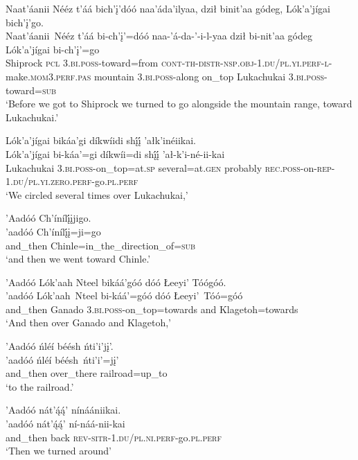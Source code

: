 \ea\label{ex:text9-3-17}
Naat’áanii Nééz t’áá bich’į’dóó naa’áda’ilyaa, dził binit’aa gódeg, Lók’a’jígai bich’į’go.\\
\gll Naat’áanii~{Nééz}	t’áá	bi-ch’į’=dóó	naa-’á-da-’-i-l-yaa	dził	bi-nit’aa	gódeg	Lók’a’jígai	bi-ch’į’=go\\
     Shiprock	\textsc{pcl}	3.\textsc{bi}.\textsc{poss}-toward=from	\textsc{cont}-\textsc{th}-\textsc{distr}-\textsc{nsp}.\textsc{obj}-1.\textsc{du}/\textsc{pl}.\textsc{yi}.\textsc{perf}-\textsc{l}-make.\textsc{mom}3.\textsc{perf}.\textsc{pas}	mountain	3.\textsc{bi}.\textsc{poss}-along	on\_top	Lukachukai	3.\textsc{bi}.\textsc{poss}-toward=\textsc{sub}\\
\glt `Before we got to Shiprock we turned to go alongside the mountain range, toward Lukachukai.'
\z

\ea\label{ex:text9-3-18}
Lók’a’jígai bikáa’gi díkwíidi shį́į́ ’ałk’inéiikai.\\
\gll Lók’a’jígai	bi-káa’=gi	díkwíi=di	shį́į́	’ał-k’i-né-ii-kai\\
     Lukachukai	3.\textsc{bi}.\textsc{poss}-on\_top=at.\textsc{sp}	several=at.\textsc{gen}	probably	\textsc{rec}.\textsc{poss}-on-\textsc{rep}-1.\textsc{du}/\textsc{pl}.\textsc{yi}.\textsc{zero}.\textsc{perf}-go.\textsc{pl}.\textsc{perf}\\
\glt `We circled several times over Lukachukai,'
\z

\ea\label{ex:text9-3-19}
’Aadóó Ch’ínílį́įjigo.\\
\gll ’aadóó	Ch’ínílį́į=ji=go\\
     and\_then	Chinle=in\_the\_direction\_of=\textsc{sub}\\
\glt `and then we went toward Chinle.'
\z

\ea\label{ex:text9-3-20}
’Aadóó Lók’aah Nteel bikáá’góó dóó Łeeyi’ Tóógóó.\\
\gll ’aadóó	Lók’aah~{Nteel}	bi-káá’=góó	dóó	Łeeyi’~{Tóó=góó}\\
     and\_then	Ganado	3.\textsc{bi}.\textsc{poss}-on\_top=towards	and	Klagetoh=towards\\
\glt `And then over Ganado and Klagetoh,'
\z

\ea\label{ex:text9-3-21}
’Aadóó ńléí béésh ńti’i’jį’.\\
\gll ’aadóó	ńléí	béésh~{ńti’i’=jį’}\\
     and\_then	over\_there	railroad=up\_to\\
\glt `to the railroad.'
\z

\ea\label{ex:text9-3-22}
’Aadóó nát’ą́ą́’ nínáániikai.\\
\gll ’aadóó	nát’ą́ą́’	ní-náá-nii-kai\\
     and\_then	back	\textsc{rev}-\textsc{sitr}-1.\textsc{du}/\textsc{pl}.\textsc{ni}.\textsc{perf}-go.\textsc{pl}.\textsc{perf}\\
\glt `Then we turned around'
\z

